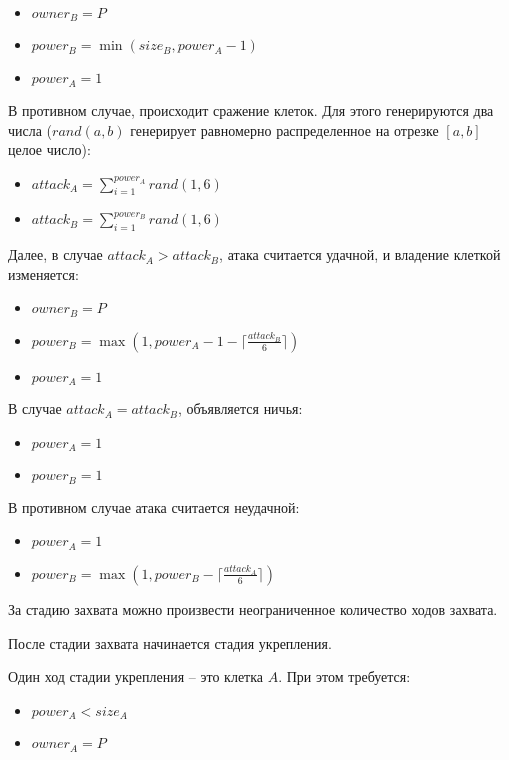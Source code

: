 \documentclass[12pt, a4paper]{article}
\begin{document}
\begin{itemize}
\item $owner_B = P$
\item $power_B = \min(size_B, power_A - 1)$
\item $power_A = 1$
\end{itemize}

В противном случае, происходит сражение клеток. Для этого генерируются два числа ($rand(a, b)$ генерирует равномерно распределенное на отрезке $[a, b]$ целое число):

\begin{itemize}
\item $attack_A = \sum \limits_{i=1}^{power_A} rand(1, 6) $
\item $attack_B = \sum \limits_{i=1}^{power_B} rand(1, 6) $
\end{itemize}

Далее, в случае $attack_A > attack_B$, атака считается удачной, и владение клеткой изменяется:

\begin{itemize}
\item $owner_B = P$
\item $power_B = \max(1, power_A - 1 - \lceil \frac{attack_B}{6} \rceil)$
\item $power_A = 1$
\end{itemize}

В случае $attack_A = attack_B$, объявляется ничья:

\begin{itemize}
\item $power_A = 1$
\item $power_B = 1$
\end{itemize}

В противном случае атака считается неудачной:

\begin{itemize}
\item $power_A = 1$
\item $power_B = \max(1, power_B - \lceil \frac{attack_A}{6} \rceil)$
\end{itemize}

За стадию захвата можно произвести неограниченное количество ходов захвата.

После стадии захвата начинается стадия укрепления. 

Один ход стадии укрепления -- это клетка $A$. При этом требуется:

\begin{itemize}
\item $power_A < size_A$
\item $owner_A = P$
\end{itemize}
\end{document}
